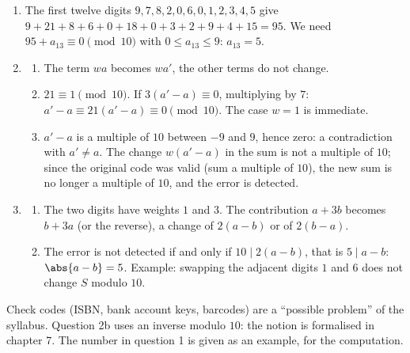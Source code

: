 \begin{solution}[Problem]
\begin{enumerate}
\item The first twelve digits $9,7,8,2,0,6,0,1,2,3,4,5$ give $9+21+8+6+0+18+0+3+2+9+4+15=95$. We need $95+a_{13}\equiv0\pmod{10}$ with $0\le a_{13}\le9$: $a_{13}=5$.
\item
\begin{enumerate}
\item The term $wa$ becomes $wa'$, the other terms do not change.
\item $21\equiv1\pmod{10}$. If $3(a'-a)\equiv0$, multiplying by $7$: $a'-a\equiv21(a'-a)\equiv0\pmod{10}$. The case $w=1$ is immediate.
\item $a'-a$ is a multiple of $10$ between $-9$ and $9$, hence zero: a contradiction with $a'\neq a$. The change $w(a'-a)$ in the sum is not a multiple of $10$; since the original code was valid (sum a multiple of $10$), the new sum is no longer a multiple of $10$, and the error is detected.
\end{enumerate}
\item
\begin{enumerate}
\item The two digits have weights $1$ and $3$. The contribution $a+3b$ becomes $b+3a$ (or the reverse), a change of $2(a-b)$ or of $2(b-a)$.
\item The error is not detected if and only if $10\mid2(a-b)$, that is $5\mid a-b$: $\abs{a-b}=5$. Example: swapping the adjacent digits $1$ and $6$ does not change $S$ modulo $10$.
\end{enumerate}
\end{enumerate}
\end{solution}
\begin{teachernote}
Check codes (ISBN, bank account keys, barcodes) are a ``possible problem'' of the syllabus. Question 2b uses an inverse modulo $10$: the notion is formalised in chapter 7. The number in question 1 is given as an example, for the computation.
\end{teachernote}
